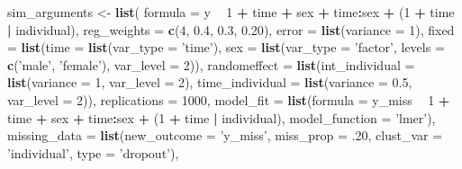 \documentclass[man,mask,floatsintext]{apa6}
\newenvironment{Shaded}{\begin{snugshade}}{\end{snugshade}}
\newcommand{\DataTypeTok}[1]{\textcolor[rgb]{0.13,0.29,0.53}{#1}}
\newcommand{\DecValTok}[1]{\textcolor[rgb]{0.00,0.00,0.81}{#1}}
\newcommand{\FloatTok}[1]{\textcolor[rgb]{0.00,0.00,0.81}{#1}}
\newcommand{\KeywordTok}[1]{\textcolor[rgb]{0.13,0.29,0.53}{\textbf{#1}}}
\newcommand{\NormalTok}[1]{#1}
\newcommand{\OperatorTok}[1]{\textcolor[rgb]{0.81,0.36,0.00}{\textbf{#1}}}
\newcommand{\StringTok}[1]{\textcolor[rgb]{0.31,0.60,0.02}{#1}}
\begin{document}
\begin{Shaded}
\begin{Highlighting}[]
\NormalTok{sim_arguments <-}\StringTok{ }\KeywordTok{list}\NormalTok{(}
  \DataTypeTok{formula =}\NormalTok{ y }\OperatorTok{~}\StringTok{ }\DecValTok{1} \OperatorTok{+}\StringTok{ }\NormalTok{time }\OperatorTok{+}\StringTok{ }\NormalTok{sex }\OperatorTok{+}\StringTok{ }\NormalTok{time}\OperatorTok{:}\NormalTok{sex }\OperatorTok{+}\StringTok{ }\NormalTok{(}\DecValTok{1} \OperatorTok{+}\StringTok{ }\NormalTok{time }\OperatorTok{|}\StringTok{ }\NormalTok{individual),}
  \DataTypeTok{reg_weights =} \KeywordTok{c}\NormalTok{(}\DecValTok{4}\NormalTok{, }\FloatTok{0.4}\NormalTok{, }\FloatTok{0.3}\NormalTok{, }\FloatTok{0.20}\NormalTok{),}
  \DataTypeTok{error =} \KeywordTok{list}\NormalTok{(}\DataTypeTok{variance =} \DecValTok{1}\NormalTok{),}
  \DataTypeTok{fixed =} \KeywordTok{list}\NormalTok{(}\DataTypeTok{time =} \KeywordTok{list}\NormalTok{(}\DataTypeTok{var_type =} \StringTok{'time'}\NormalTok{),}
               \DataTypeTok{sex =} \KeywordTok{list}\NormalTok{(}\DataTypeTok{var_type =} \StringTok{'factor'}\NormalTok{, }\DataTypeTok{levels =} \KeywordTok{c}\NormalTok{(}\StringTok{'male'}\NormalTok{, }\StringTok{'female'}\NormalTok{),}
                          \DataTypeTok{var_level =} \DecValTok{2}\NormalTok{)),}
  \DataTypeTok{randomeffect =} \KeywordTok{list}\NormalTok{(}\DataTypeTok{int_individual =} \KeywordTok{list}\NormalTok{(}\DataTypeTok{variance =} \DecValTok{1}\NormalTok{, }\DataTypeTok{var_level =} \DecValTok{2}\NormalTok{),}
                      \DataTypeTok{time_individual =} \KeywordTok{list}\NormalTok{(}\DataTypeTok{variance =} \FloatTok{0.5}\NormalTok{, }\DataTypeTok{var_level =} \DecValTok{2}\NormalTok{)),}
  \DataTypeTok{replications =} \DecValTok{1000}\NormalTok{,}
  \DataTypeTok{model_fit =} \KeywordTok{list}\NormalTok{(}\DataTypeTok{formula =}\NormalTok{ y_miss }\OperatorTok{~}\StringTok{ }\DecValTok{1} \OperatorTok{+}\StringTok{ }\NormalTok{time }\OperatorTok{+}\StringTok{ }\NormalTok{sex }\OperatorTok{+}\StringTok{ }\NormalTok{time}\OperatorTok{:}\NormalTok{sex }\OperatorTok{+}\StringTok{ }
\StringTok{                     }\NormalTok{(}\DecValTok{1} \OperatorTok{+}\StringTok{ }\NormalTok{time }\OperatorTok{|}\StringTok{ }\NormalTok{individual), }
                   \DataTypeTok{model_function =} \StringTok{'lmer'}\NormalTok{),}
  \DataTypeTok{missing_data =} \KeywordTok{list}\NormalTok{(}\DataTypeTok{new_outcome =} \StringTok{'y_miss'}\NormalTok{, }\DataTypeTok{miss_prop =} \FloatTok{.20}\NormalTok{,}
                      \DataTypeTok{clust_var =} \StringTok{'individual'}\NormalTok{, }\DataTypeTok{type =} \StringTok{'dropout'}\NormalTok{),}

\end{Highlighting}
\end{Shaded}
\end{document}
